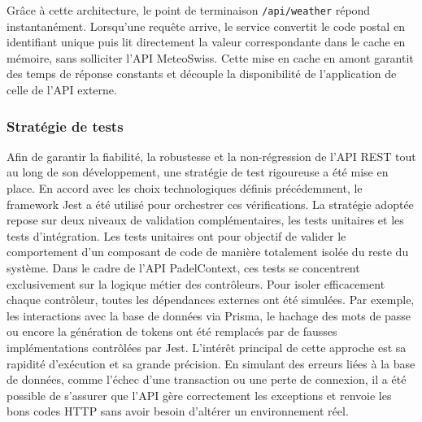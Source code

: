 \documentclass[12pt]{article}
\begin{document}
\newline\newline
Grâce à cette architecture, le point de terminaison \texttt{/api/weather} répond instantanément. Lorsqu'une requête arrive, le service convertit le code postal en identifiant unique puis lit directement la valeur correspondante dans le cache en mémoire, sans solliciter l'API MeteoSwiss. Cette mise en cache en amont garantit des temps de réponse constants et découple la disponibilité de l'application de celle de l'API externe.

\subsubsection{Stratégie de tests}
Afin de garantir la fiabilité, la robustesse et la non-régression de l'API REST tout au long de son développement, une stratégie de test rigoureuse a été mise en place. En accord avec les choix technologiques définis précédemment, le framework Jest a été utilisé pour orchestrer ces vérifications. La stratégie adoptée repose sur deux niveaux de validation complémentaires, les tests unitaires et les tests d'intégration.
\newline\newline
Les tests unitaires ont pour objectif de valider le comportement d'un composant de code de manière totalement isolée du reste du système. Dans le cadre de l'API PadelContext, ces tests se concentrent exclusivement sur la logique métier des contrôleurs. Pour isoler efficacement chaque contrôleur, toutes les dépendances externes ont été simulées. Par exemple, les interactions avec la base de données via Prisma, le hachage des mots de passe ou encore la génération de tokens ont été remplacés par de fausses implémentations contrôlées par Jest. L'intérêt principal de cette approche est sa rapidité d'exécution et sa grande précision. En simulant des erreurs liées à la base de données, comme l'échec d'une transaction ou une perte de connexion, il a été possible de s'assurer que l'API gère correctement les exceptions et renvoie les bons codes HTTP sans avoir besoin d'altérer un environnement réel.
\newline\newline
\end{document}
